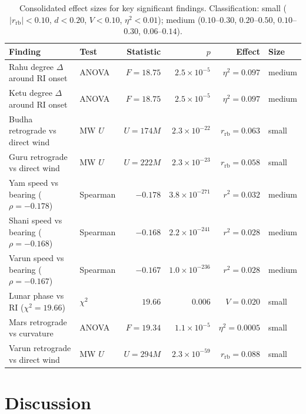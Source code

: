 \documentclass[12pt,a4paper]{article}
\begin{document}
\begin{table}[H]
  \centering
  \caption{Consolidated effect sizes for key significant findings.
           Classification: small ($|r_\text{rb}| < 0.10$, $d < 0.20$, $V < 0.10$,
           $\eta^2 < 0.01$); medium ($0.10$--$0.30$, $0.20$--$0.50$, $0.10$--$0.30$,
           $0.06$--$0.14$).}
  \label{tab:effect_sizes}
  \begin{tabular}{p{5.5cm}lrrrl}
    \toprule
    \textbf{Finding} & \textbf{Test} & \textbf{Statistic} & \boldmath$p$ &
    \textbf{Effect} & \textbf{Size} \\
    \midrule
    Rahu degree $\Delta$ around RI onset  & ANOVA  & $F=18.75$ & $2.5\times10^{-5}$ & $\eta^2=0.097$ & medium \\
    Ketu degree $\Delta$ around RI onset  & ANOVA  & $F=18.75$ & $2.5\times10^{-5}$ & $\eta^2=0.097$ & medium \\
    Budha retrograde vs direct wind       & MW $U$ & $U=174M$ & $2.3\times10^{-22}$ & $r_\text{rb}=0.063$ & small \\
    Guru retrograde vs direct wind        & MW $U$ & $U=222M$ & $2.3\times10^{-23}$ & $r_\text{rb}=0.058$ & small \\
    Yam speed vs bearing ($\rho=-0.178$)  & Spearman & $-0.178$ & $3.8\times10^{-271}$ & $r^2=0.032$ & medium \\
    Shani speed vs bearing ($\rho=-0.168$)& Spearman & $-0.168$ & $2.2\times10^{-241}$ & $r^2=0.028$ & medium \\
    Varun speed vs bearing ($\rho=-0.167$)& Spearman & $-0.167$ & $1.0\times10^{-236}$ & $r^2=0.028$ & medium \\
    Lunar phase vs RI ($\chi^2=19.66$)    & $\chi^2$ & $19.66$  & $0.006$ & $V=0.020$ & small \\
    Mars retrograde vs curvature          & ANOVA  & $F=19.34$ & $1.1\times10^{-5}$ & $\eta^2=0.0005$ & small \\
    Varun retrograde vs direct wind       & MW $U$ & $U=294M$ & $2.3\times10^{-59}$ & $r_\text{rb}=0.088$ & small \\
    \bottomrule
  \end{tabular}
\end{table}

\section{Discussion}
\label{sec:discussion}
\end{document}
